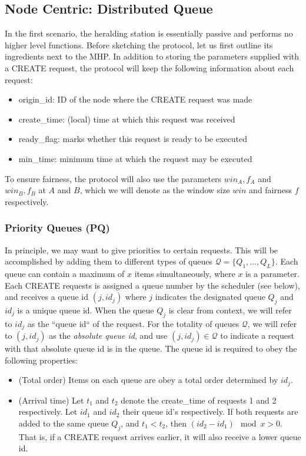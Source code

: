 \documentclass{article}
\begin{document}
\subsection{Node Centric: Distributed Queue}
In the first scenario, the heralding station is essentially passive and performs no higher level functions. 
Before sketching the protocol, let us first outline its ingredients next to the MHP.
In addition to storing the parameters supplied with a CREATE request, the protocol will keep the following information about each request:
\begin{itemize}
\item origin\_id: ID of the node where the CREATE request was made
\item create\_time: (local) time at which this request was received
\item ready\_flag: marks whether this request is ready to be executed
\item min\_time: minimum time at which the request may be executed
\end{itemize}
To ensure fairness, the protocol will also use the parameters $win_A, f_A$ and $win_B,f_B$ at $A$ and $B$, which we will denote as the window size $win$ and
fairness $f$ respectively. 

\subsubsection{Priority Queues (PQ)}
In principle, we may want to give priorities to certain requests. This will be accomplished by adding them to different types of queues $\mathcal{Q} = 
\{Q_1,\ldots,Q_L\}$. 
Each queue can contain a maximum of $x$ items simultaneously, where $x$ is a parameter. 
Each CREATE requests is assigned a queue number by the scheduler (see below), and receives a queue id $(j, id_j)$ where $j$ indicates the designated queue $Q_j$
and $id_j$ is a unique queue id. 
When the queue $Q_j$ is clear from context, we will refer to $id_j$ as the ``queue id`` of the request. For the totality of queues $\mathcal{Q}$, we will refer to $(j, id_j)$ as the \emph{absolute queue id}, and use
$(j,id_j) \in \mathcal{Q}$ to indicate a request with that absolute queue id is in the queue.
The queue id is required to obey the following properties:
\begin{itemize}
\item (Total order) Items on each queue are obey a total order determined by $id_j$. 
\item (Arrival time) Let $t_1$ and $t_2$ denote the create\_time of requests 1 and 2 respectively. Let $id_1$ and $id_2$ their queue id's respectively.
If both requests are added to the same queue $Q_j$, and $t_1 < t_2$, then $(id_2 - id_1) \mod x > 0$. That is, if a CREATE request arrives earlier, it will also 
receive a lower queue id.
\end{itemize}
\end{document}
